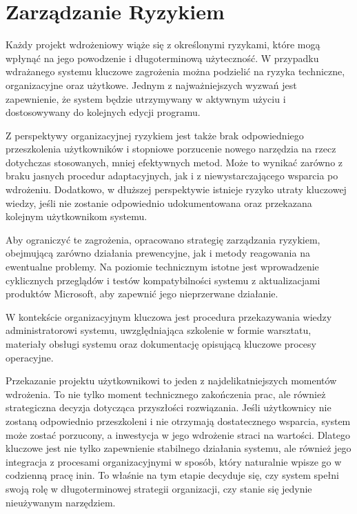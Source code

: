 \section{Zarządzanie Ryzykiem}
Każdy projekt wdrożeniowy wiąże się z określonymi ryzykami, które mogą wpłynąć na jego powodzenie i długoterminową użyteczność. W przypadku wdrażanego systemu kluczowe zagrożenia można podzielić na ryzyka techniczne, organizacyjne oraz użytkowe. Jednym z najważniejszych wyzwań jest zapewnienie, że system będzie utrzymywany w aktywnym użyciu i dostosowywany do kolejnych edycji programu.

Z perspektywy organizacyjnej ryzykiem jest także brak odpowiedniego przeszkolenia użytkowników i stopniowe porzucenie nowego narzędzia na rzecz dotychczas stosowanych, mniej efektywnych metod. Może to wynikać zarówno z braku jasnych procedur adaptacyjnych, jak i z niewystarczającego wsparcia po wdrożeniu. Dodatkowo, w dłuższej perspektywie istnieje ryzyko utraty kluczowej wiedzy, jeśli nie zostanie odpowiednio udokumentowana oraz przekazana kolejnym użytkownikom systemu.

Aby ograniczyć te zagrożenia, opracowano strategię zarządzania ryzykiem, obejmującą zarówno działania prewencyjne, jak i metody reagowania na ewentualne problemy. Na poziomie technicznym istotne jest wprowadzenie cyklicznych przeglądów i testów kompatybilności systemu z aktualizacjami produktów Microsoft, aby zapewnić jego nieprzerwane działanie. 

W kontekście organizacyjnym kluczowa jest procedura przekazywania wiedzy administratorowi systemu, uwzględniająca szkolenie w formie warsztatu, materiały obsługi systemu oraz dokumentację opisującą kluczowe procesy operacyjne.

Przekazanie projektu użytkownikowi to jeden z najdelikatniejszych momentów wdrożenia. To nie tylko moment technicznego zakończenia prac, ale również strategiczna decyzja dotycząca przyszłości rozwiązania. Jeśli użytkownicy nie zostaną odpowiednio przeszkoleni i nie otrzymają dostatecznego wsparcia, system może zostać porzucony, a inwestycja w jego wdrożenie straci na wartości. Dlatego kluczowe jest nie tylko zapewnienie stabilnego działania systemu, ale również jego integracja z procesami organizacyjnymi w sposób, który naturalnie wpisze go w codzienną pracę \gls{inin}. To właśnie na tym etapie decyduje się, czy system spełni swoją rolę w długoterminowej strategii organizacji, czy stanie się jedynie nieużywanym narzędziem.
